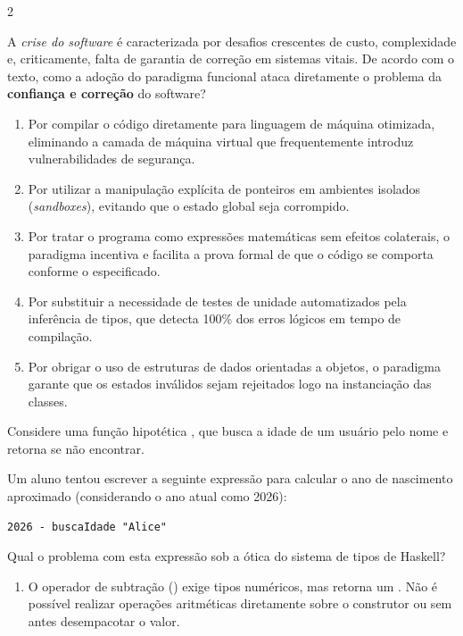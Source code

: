 \documentclass[a4paper,10pt,brazil]{article}
\begin{document}
\begin{multicols}{2}
\begin{enumerate}
\end{enumerate}

A \emph{crise do software} é caracterizada por desafios crescentes de custo, complexidade e, criticamente, falta de garantia de correção em sistemas vitais. De acordo com o texto, como a adoção do paradigma funcional ataca diretamente o problema da \textbf{confiança e correção} do software?

\begin{enumerate}
  \item Por compilar o código diretamente para linguagem de máquina otimizada, eliminando a camada de máquina virtual que frequentemente introduz vulnerabilidades de segurança.

  \item Por utilizar a manipulação explícita de ponteiros em ambientes isolados (\emph{sandboxes}), evitando que o estado global seja corrompido.

  \item Por tratar o programa como expressões matemáticas sem efeitos colaterais, o paradigma incentiva e facilita a prova formal de que o código se comporta conforme o especificado.

  \item Por substituir a necessidade de testes de unidade automatizados pela inferência de tipos, que detecta 100\% dos erros lógicos em tempo de compilação.

  \item Por obrigar o uso de estruturas de dados orientadas a objetos, o paradigma garante que os estados inválidos sejam rejeitados logo na instanciação das classes.


\end{enumerate}

Considere uma função hipotética , que busca a idade de um usuário pelo nome e retorna  se não encontrar. 

Um aluno tentou escrever a seguinte expressão para calcular o ano de nascimento aproximado (considerando o ano atual como 2026):
\begin{verbatim}
2026 - buscaIdade "Alice"
\end{verbatim}

Qual o problema com esta expressão sob a ótica do sistema de tipos de Haskell?

\begin{enumerate}
  \item O operador de subtração (\haskellinline{-}) exige tipos numéricos, mas  retorna um . Não é possível realizar operações aritméticas diretamente sobre o construtor  ou  sem antes desempacotar o valor.


\end{enumerate}
\end{multicols}
\end{document}
